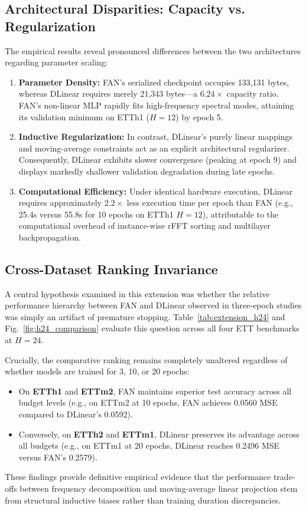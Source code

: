 \documentclass[journal]{IEEEtran}
\begin{document}
\subsection{Architectural Disparities: Capacity vs. Regularization}
The empirical results reveal pronounced differences between the two architectures regarding parameter scaling:
\begin{enumerate}
    \item \textbf{Parameter Density:} FAN's serialized checkpoint occupies 133,131 bytes, whereas DLinear requires merely 21,343 bytes—a $6.24\times$ capacity ratio. FAN's non-linear MLP rapidly fits high-frequency spectral modes, attaining its validation minimum on ETTh1 ($H=12$) by epoch 5.
    \item \textbf{Inductive Regularization:} In contrast, DLinear's purely linear mappings and moving-average constraints act as an explicit architectural regularizer. Consequently, DLinear exhibits slower convergence (peaking at epoch 9) and displays markedly shallower validation degradation during late epochs.
    \item \textbf{Computational Efficiency:} Under identical hardware execution, DLinear requires approximately $2.2\times$ less execution time per epoch than FAN (e.g., 25.4s versus 55.8s for 10 epochs on ETTh1 $H=12$), attributable to the computational overhead of instance-wise rFFT sorting and multilayer backpropagation.
\end{enumerate}

\subsection{Cross-Dataset Ranking Invariance}
A central hypothesis examined in this extension was whether the relative performance hierarchy between FAN and DLinear observed in three-epoch studies was simply an artifact of premature stopping. Table~\ref{tab:extension_h24} and Fig.~\ref{fig:h24_comparison} evaluate this question across all four ETT benchmarks at $H=24$.

Crucially, the comparative ranking remains completely unaltered regardless of whether models are trained for 3, 10, or 20 epochs:
\begin{itemize}
    \item On \textbf{ETTh1} and \textbf{ETTm2}, FAN maintains superior test accuracy across all budget levels (e.g., on ETTm2 at 10 epochs, FAN achieves 0.0560 MSE compared to DLinear's 0.0592).
    \item Conversely, on \textbf{ETTh2} and \textbf{ETTm1}, DLinear preserves its advantage across all budgets (e.g., on ETTm1 at 20 epochs, DLinear reaches 0.2496 MSE versus FAN's 0.2579).
\end{itemize}
These findings provide definitive empirical evidence that the performance trade-offs between frequency decomposition and moving-average linear projection stem from structural inductive biases rather than training duration discrepancies.
\end{document}
